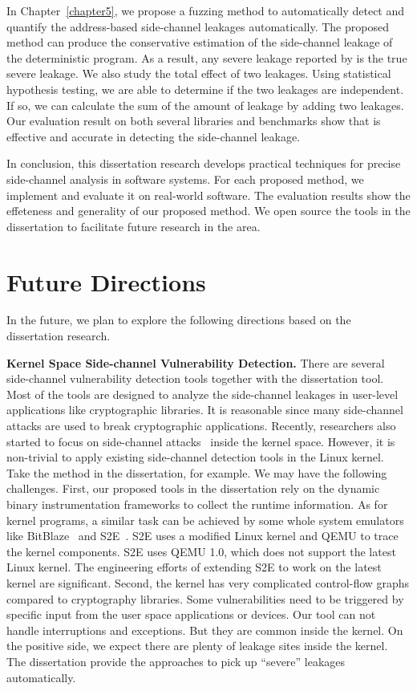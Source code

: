 In Chapter~\ref{chapter5}, we propose a fuzzing method to automatically detect and quantify the address-based side-channel leakages automatically. The proposed method can produce the conservative estimation of the side-channel leakage of the deterministic program. As a result, any severe leakage reported by \ctool{} is the true severe leakage. We also study the total effect of two leakages. Using statistical hypothesis testing, we are able to determine if the two leakages are independent. If so, we can calculate the sum of the amount of leakage by adding two leakages. Our evaluation result on both several libraries and benchmarks show that \ctool{} is effective and accurate in detecting the side-channel leakage.

In conclusion, this dissertation research develops practical techniques for precise side-channel analysis in software systems. For each proposed method, we implement and evaluate it on real-world software. The evaluation results show the effeteness and generality of our proposed method.  We open source the tools in the dissertation to facilitate future research in the area.
\section{Future Directions}
In the future, we plan to explore the following directions based on the dissertation research. 

\textbf{Kernel Space Side-channel Vulnerability Detection.} There are several side-channel vulnerability detection tools together with the dissertation tool. Most of the tools are designed to analyze the side-channel leakages in user-level applications like cryptographic libraries. It is reasonable since many side-channel attacks are used to break cryptographic applications. Recently, researchers also started to focus on side-channel attacks~\cite{cao2016off} inside the kernel space. However, it is non-trivial to apply existing side-channel detection tools in the Linux kernel. Take the method in the dissertation, for example. We may have the following challenges. First, our proposed tools in the dissertation rely on the dynamic binary instrumentation frameworks to collect the runtime information. As for kernel programs, a similar task can be achieved by some whole system emulators like BitBlaze~\cite{song2008bitblaze} and S2E~\cite{chipounov2012s2e}. S2E uses a modified Linux kernel and QEMU to trace the kernel components. S2E uses QEMU 1.0, which does not support the latest Linux kernel. The engineering efforts of extending S2E to work on the latest kernel are significant. Second, the kernel has very complicated control-flow graphs compared to cryptography libraries. Some vulnerabilities need to be triggered by specific input from the user space applications or devices. Our tool can not handle interruptions and exceptions. But they are common inside the kernel. On the positive side, we expect there are plenty of leakage sites inside the kernel. The dissertation provide the approaches to pick up ``severe'' leakages automatically.


